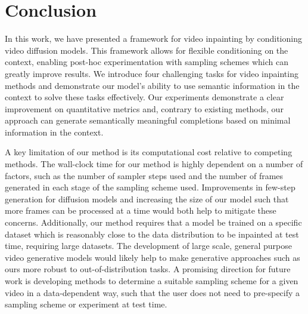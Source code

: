 
\chapter{Conclusion}
In this work, we have presented a framework for video inpainting by conditioning video diffusion models. This framework allows for flexible conditioning on the context, enabling post-hoc experimentation with sampling schemes which can greatly improve results. We introduce four challenging tasks for video inpainting methods and demonstrate our model's ability to use semantic information in the context to solve these tasks effectively. Our experiments demonstrate a clear improvement on quantitative metrics and, contrary to existing methods, our approach can generate semantically meaningful completions based on minimal information in the context. 

A key limitation of our method is its computational cost relative to competing methods. The wall-clock time for our method is highly dependent on a number of factors, such as the number of sampler steps used and the number of frames generated in each stage of the sampling scheme used. Improvements in few-step generation for diffusion models and increasing the size of our model such that more frames can be processed at a time would both help to mitigate these concerns. Additionally, our method requires that a model be trained on a specific dataset which is reasonably close to the data distribution to be inpainted at test time, requiring large datasets. The development of large scale, general purpose video generative models would likely help to make generative approaches such as ours more robust to out-of-distribution tasks. A promising direction for future work is developing methods to determine a suitable sampling scheme for a given video in a data-dependent way, such that the user does not need to pre-specify a sampling scheme or experiment at test time. 